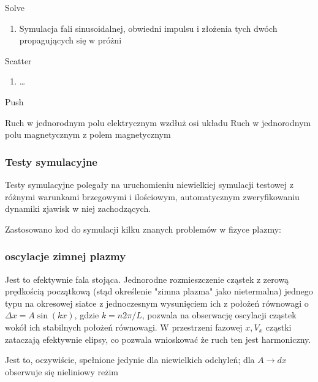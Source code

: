 {\begin{enumerate}
        \itemi Solve
            \begin{enumerate}
                \item Symulacja fali sinusoidalnej, obwiedni impulsu i złożenia tych dwóch
                    propagujących się w próżni
            \end{enumerate}

        \itemi Scatter
            \begin{enumerate}
                \item \ldots {}
            \end{enumerate}

        \itemi Push
            \begin{enumerate}
                \itemii Ruch w jednorodnym polu elektrycznym wzdłuż osi układu
                \itemii Ruch w jednorodnym polu magnetycznym z polem magnetycznym
            \end{enumerate}
    \end{enumerate}

    \subsubsection{Testy symulacyjne}
    Testy symulacyjne polegały na uruchomieniu niewielkiej symulacji testowej z różnymi warunkami brzegowymi
    i ilościowym, automatycznym zweryfikowaniu dynamiki zjawisk w niej zachodzących.

    Zastosowano kod do symulacji kilku znanych problemów w fizyce plazmy:
    \subsubsection{oscylacje zimnej plazmy}
    Jest to efektywnie fala stojąca. Jednorodne rozmieszczenie cząstek z zerową prędkością początkową (stąd określenie
    "zimna plazma" jako nietermalna)
    jednego typu na okresowej siatce z jednoczesnym wysunięciem ich z położeń równowagi o $\Delta x = A \sin(kx)$,
    gdzie $k = n 2 \pi / L$, pozwala na obserwację
    oscylacji cząstek wokół ich stabilnych położeń równowagi. W przestrzeni fazowej $x, V_x$ cząstki zataczają efektywnie
    elipsy, co pozwala wnioskować że ruch ten jest harmoniczny.

    Jest to, oczywiście, spełnione jedynie dla niewielkich odchyleń; dla $A \to dx$ 
    obserwuje się nieliniowy reżim 

}
